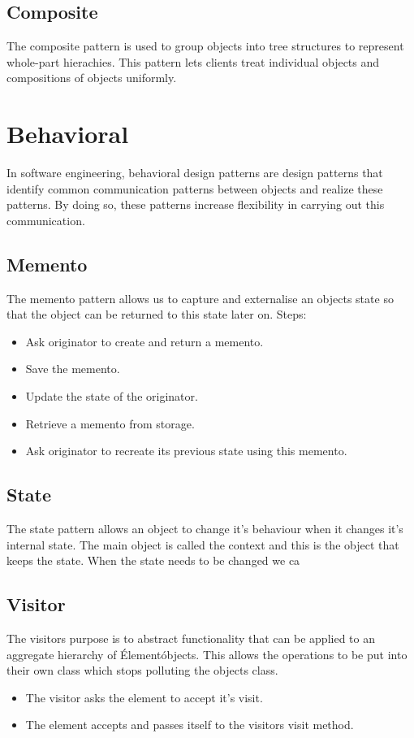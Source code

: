 \subsection{Composite}
The composite pattern is used to group objects into tree structures to represent whole-part hierachies. This pattern lets clients treat individual objects and compositions of objects uniformly. \cite{sourcemaking}

\section{Behavioral}
In software engineering, behavioral design patterns are design patterns that identify common communication patterns between objects and realize these patterns. By doing so, these patterns increase flexibility in carrying out this communication. \cite{sourcemaking}

\subsection{Memento}
The memento pattern allows us to capture and externalise an objects state so that the object can be returned to this state later on.
Steps:
\begin{itemize}
	\item Ask originator to create and return a memento.
	\item Save the memento.
	\item Update the state of the originator.
	\item Retrieve a memento from storage.
	\item Ask originator to recreate its previous state using this memento.
\end{itemize}

\subsection{State}
The state pattern allows an object to change it's behaviour when it changes it's internal state. The main object is called the context and this is the object that keeps the state. When the state needs to be changed we ca

\subsection{Visitor}
The visitors purpose is to abstract functionality that can be applied to an aggregate hierarchy of \'Element\' objects. \cite{sourcemaking} This allows the operations to be put into their own class which stops polluting the objects class.
\begin{itemize}
	\item The visitor asks the element to accept it's visit.
	\item The element accepts and passes itself to the visitors visit method.
\end{itemize}
